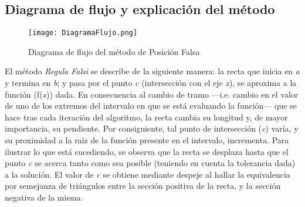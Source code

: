 \documentclass{article}
\begin{document}
\subsection{Diagrama de flujo y explicación del método}
\begin{figure}[H]
    \centering
    \texttt{[image: DiagramaFlujo.png]}
    \caption{Diagrama de flujo del método de Posición Falsa}
    \label{fig:DiagramaFlujo}
\end{figure}
El método \emph{Regula Falsi} se describe de la siguiente manera: la recta que inicia en \emph{a} y termina en \emph{b}; y pasa por el punto \emph{c} (intersección con el eje \emph{x}), se aproxima a la función (f(\emph{x})) dada. En consecuencia al cambio de tramo —i.e. cambio en el valor de uno de los extremos del intervalo en que se está evaluando la función— que se hace tras cada iteración del algoritmo, la recta cambia su longitud y, de mayor importancia, su pendiente. Por consiguiente, tal punto de intersección (\emph{c}) varía, y su proximidad a la raíz de la función presente en el intervalo, incrementa. Para ilustrar lo que está sucediendo, se observa que la recta se desplaza hasta que el punto \emph{c} se acerca tanto como sea posible (teniendo en cuenta la tolerancia dada) a la solución. El valor de \emph{c} se obtiene mediante despeje al hallar la equivalencia por semejanza de triángulos entre la sección positiva de la recta, y la sección negativa de la misma.
\end{document}
